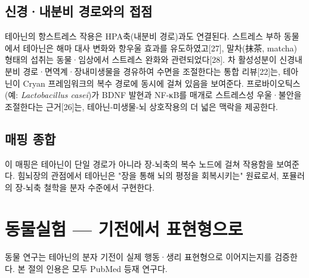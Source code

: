 \documentclass[11pt,oneside]{book}
\begin{document}
\subsection{신경·내분비 경로와의 접점}
테아닌의 항스트레스 작용은 HPA축(내분비 경로)과도 연결된다. 스트레스 부하 동물에서 테아닌은 해마 대사 변화와 항우울 효과를 유도하였고[27], 말차(抹茶, matcha) 형태의 섭취는 동물·임상에서 스트레스 완화와 관련되었다[28]. 차 활성성분이 신경내분비 경로·면역계·장내미생물을 경유하여 수면을 조절한다는 통합 리뷰[22]는, 테아닌이 Cryan 프레임워크의 복수 경로에 동시에 걸쳐 있음을 보여준다. 프로바이오틱스(예: \textit{Lactobacillus casei})가 BDNF 발현과 NF-κB를 매개로 스트레스성 우울·불안을 조절한다는 근거[26]는, 테아닌-미생물-뇌 상호작용의 더 넓은 맥락을 제공한다.

\subsection{매핑 종합}
\vspace{2pt}\vspace{3pt}

이 매핑은 테아닌이 단일 경로가 아니라 장-뇌축의 복수 노드에 걸쳐 작용함을 보여준다. 힘뇌장의 관점에서 테아닌은 "장을 통해 뇌의 평정을 회복시키는" 원료로서, 포뮬러의 장-뇌축 철학을 분자 수준에서 구현한다.

\section{동물실험 — 기전에서 표현형으로}
동물 연구는 테아닌의 분자 기전이 실제 행동·생리 표현형으로 이어지는지를 검증한다. 본 절의 인용은 모두 PubMed 등재 연구다.
\end{document}
